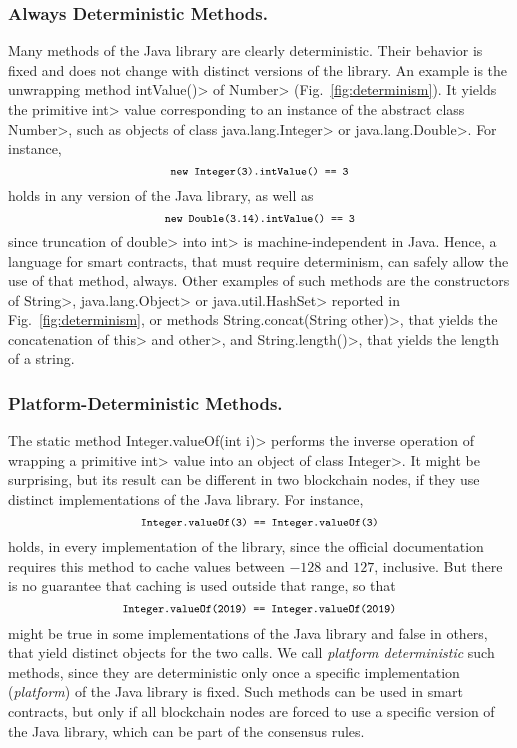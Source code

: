 \subsubsection*{Always Deterministic Methods.}
Many methods of the Java library are clearly deterministic. Their behavior is fixed
and does not change with distinct versions of the library. An example is the unwrapping
method \<intValue()> of \<Number> (Fig.~\ref{fig:determinism}). It yields
the primitive \<int> value corresponding to an instance of the abstract class \<Number>, such
as objects of class \<java.lang.Integer> or \<java.lang.Double>. For instance,
\[
\<new Integer(3).intValue() == 3>
\]
holds in any version of the Java library, as well as
\[
\<new Double(3.14).intValue() == 3>
\]
since truncation of \<double> into \<int> is machine-independent in Java.
Hence, a language for smart contracts, that must require determinism,
can safely allow the use of that method, always. Other examples of such methods
are the constructors of \<String>, \<java.lang.Object> or \<java.util.HashSet>
reported in Fig.~\ref{fig:determinism}, or methods
\<String.concat(String other)>, that yields the concatenation of \<this> and \<other>,
and \<String.length()>, that yields the length of a string.

\subsubsection*{Platform-Deterministic Methods.}
The static method \<Integer.valueOf(int i)> performs the inverse operation of wrapping
a primitive \<int> value into an object of class \<Integer>. It might be surprising,
but its result can be different in two blockchain nodes, if they
use distinct implementations of the Java library. For instance,
\[
\<Integer.valueOf(3) == Integer.valueOf(3)>
\]
holds, in every implementation of the library, since the official documentation requires this method
to cache values between $-128$ and $127$, inclusive. But there is no guarantee that caching is
used outside that range, so that
\[
\<Integer.valueOf(2019) == Integer.valueOf(2019)>
\]
might be true in some implementations of the Java library
and false in others, that yield distinct objects for the two calls.
We call \emph{platform deterministic} such methods, since they are deterministic only once a specific
implementation (\emph{platform}) of the Java library is fixed. Such methods can be used in smart contracts,
but only if all blockchain nodes are forced to
use a specific version of the Java library, which can be part of the consensus rules.

